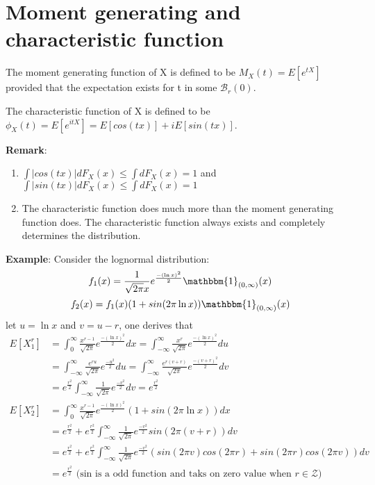 \documentclass[../Transformation.tex]{subfiles}
\begin{document}
\section{Moment generating and characteristic function}
\begin{definition}
The moment generating function of X is defined to be $M_X(t)=E[e^{tX}]$ provided that the expectation exists for t in some $\mathcal{B}_r(0)$.
\end{definition}
\begin{definition}
The characteristic function of X is defined to be $\phi_X(t)=E[e^{itX}]=E[cos(tx)]+iE[sin(tx)]$. 
\end{definition}
{\bf Remark}:
\begin{enumerate}
\item $\int|cos(tx)|dF_X(x)\leq\int dF_X(x)=1$ and $\int|sin(tx)|dF_X(x)\leq\int dF_X(x)=1$
\item The characteristic function does much more than the moment generating function does. The characteristic function always exists and completely determines the distribution.
\end{enumerate}
{\bf Example}:
Consider the lognormal distribution: $$f_1(x)=\frac{1}{\sqrt{2\pi}x}e^{\frac{-(\ln x)^2}{2}}\mathbbm{1}_{(0,\infty)}(x)$$
$$f_2(x)=f_1(x)(1+sin(2\pi\ln x))\mathbbm{1}_{(0,\infty)}(x)$$
let $u=\ln x$ and $v=u-r$, one derives that
\begin{align*}
E[X_1^r]&=\int_0^\infty\frac{x^{r-1}}{\sqrt{2\pi}}e^{\frac{-(\ln x)^2}{2}}dx
=\int_{-\infty}^\infty\frac{x^r}{\sqrt{2\pi}}e^{\frac{-(\ln x)^2}{2}}du\\
&=\int_{-\infty}^\infty\frac{e^{ru}}{\sqrt{2\pi}}e^{\frac{-u^2}{2}}du=\int_{-\infty}^\infty\frac{e^{r(v+r)}}{\sqrt{2\pi}}e^{\frac{-(v+r)^2}{2}}dv\\
&=e^{\frac{r^2}{2}}\int_{-\infty}^{\infty}\frac{1}{\sqrt{2\pi}}e^{\frac{-v^2}{2}}dv=e^{\frac{r^2}{2}}\\
E[X_2^r]&=\int_0^\infty\frac{x^{r-1}}{\sqrt{2\pi}}e^{\frac{-(\ln x)^2}{2}}(1+sin(2\pi\ln x))dx
\\
&=e^{\frac{r^2}{2}}+e^{\frac{r^2}{2}}\int_{-\infty}^{\infty}\frac{1}{\sqrt{2\pi}}e^{\frac{-v^2}{2}}sin(2\pi (v+r))dv\\
&=e^{\frac{r^2}{2}}+e^{\frac{r^2}{2}}\int_{-\infty}^{\infty}\frac{1}{\sqrt{2\pi}}e^{\frac{-v^2}{2}}(sin(2\pi v)cos(2\pi r)+sin(2\pi r)cos(2\pi v))dv\\
&=e^{\frac{r^2}{2}} \mbox{ (sin is a odd function and taks on zero value when $r\in\mathcal{Z}$)}
\end{align*}
\end{document}
